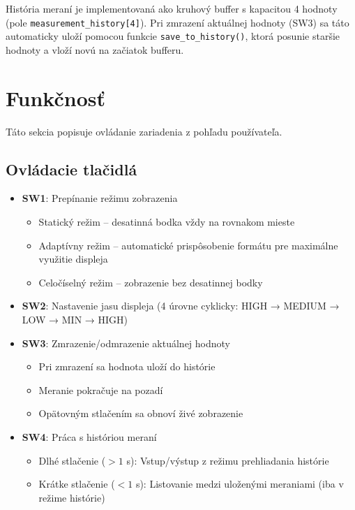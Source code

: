 \documentclass[a4paper, 11pt]{article}
\begin{document}
História meraní je implementovaná ako kruhový buffer s kapacitou 4 hodnoty (pole \texttt{measurement\_history[4]}). Pri zmrazení aktuálnej hodnoty (SW3) sa táto automaticky uloží pomocou funkcie \texttt{save\_to\_history()}, ktorá posunie staršie hodnoty a vloží novú na začiatok bufferu.


\section{Funkčnosť}

Táto sekcia popisuje ovládanie zariadenia z pohľadu používateľa.

\subsection{Ovládacie tlačidlá}

\begin{itemize}
    \item \textbf{SW1}: Prepínanie režimu zobrazenia
    \begin{itemize}
        \item Statický režim -- desatinná bodka vždy na rovnakom mieste
        \item Adaptívny režim -- automatické prispôsobenie formátu pre maximálne využitie displeja
        \item Celočíselný režim -- zobrazenie bez desatinnej bodky
    \end{itemize}
    
    \item \textbf{SW2}: Nastavenie jasu displeja (4 úrovne cyklicky: HIGH → MEDIUM → LOW → MIN → HIGH)
    
    \item \textbf{SW3}: Zmrazenie/odmrazenie aktuálnej hodnoty
    \begin{itemize}
        \item Pri zmrazení sa hodnota uloží do histórie
        \item Meranie pokračuje na pozadí
        \item Opätovným stlačením sa obnoví živé zobrazenie
    \end{itemize}
    
    \item \textbf{SW4}: Práca s históriou meraní
    \begin{itemize}
        \item Dlhé stlačenie ($>1$ s): Vstup/výstup z režimu prehliadania histórie
        \item Krátke stlačenie ($<1$ s): Listovanie medzi uloženými meraniami (iba v režime histórie)
    \end{itemize}
\end{itemize}
\end{document}
